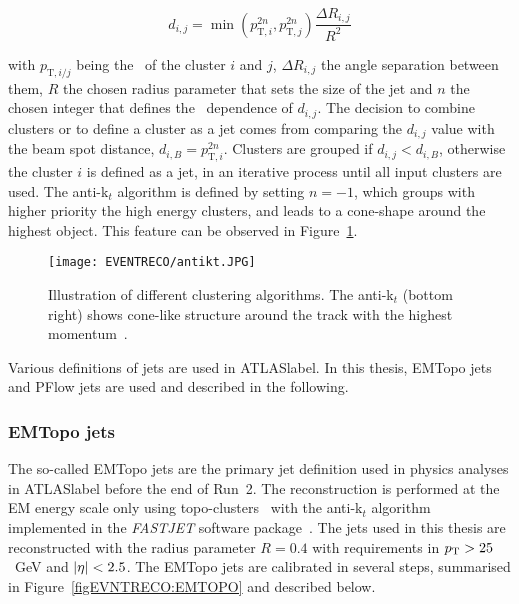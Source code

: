 \begin{equation}
    d_{i,j} = \min (p_{\text{T},i}^{2n},p_{\text{T},j}^{2n}) \frac{\Delta R_{i,j}}{R^2}
\end{equation}

with $p_{\text{T},i/j}$ being the \pT\ of the cluster $i$ and $j$, $\Delta R_{i,j}$ the angle separation between them, $R$ the chosen radius parameter that sets the size of the jet and $n$ the chosen integer that defines the \pT\ dependence of $d_{i,j}$. The decision to combine clusters or to define a cluster as a jet comes from comparing the $d_{i,j}$ value with the beam spot distance, $d_{i,B} = p_{\text{T},i}^{2n}$. Clusters are grouped if $d_{i,j} < d_{i,B}$, otherwise the cluster $i$ is defined as a jet, in an iterative process until all input clusters are used. The anti-k$_t$ algorithm is defined by setting $n=-1$, which groups with higher priority the high energy clusters, and leads to a cone-shape around the highest object. This feature can be observed in Figure~\ref{figEVNTRECO:antikt}.

\begin{figure}[htbp]
    \RawFloats
    \begin{center}
    \texttt{[image: EVENTRECO/antikt.JPG]}
    \caption{
        Illustration of different clustering algorithms. The anti-k$_t$ (bottom right) shows cone-like structure around the track with the highest momentum~\cite{Cacciari_2008}. 
    }
    \label{figEVNTRECO:antikt}
    \end{center}
\end{figure}

Various definitions of jets are used in \acrshort{ATLASlabel}. In this thesis, EMTopo jets and PFlow jets are used and described in the following.

\subsubsection{EMTopo jets}

The so-called EMTopo jets are the primary jet definition used in physics analyses in \acrshort{ATLASlabel} before the end of Run~2. The reconstruction is performed at the EM energy scale only using topo-clusters~\cite{PhysRevD.96.072002} with the anti-k$_t$ algorithm implemented in the \textit{FASTJET} software package~\cite{Cacciari2012}. The jets used in this thesis are reconstructed with the radius parameter $R = 0.4$ with requirements in $p_{\text{T}} > 25$~GeV and $\abs{\eta} < 2.5$. The EMTopo jets are calibrated in several steps, summarised in Figure~\ref{figEVNTRECO:EMTOPO} and described below.

